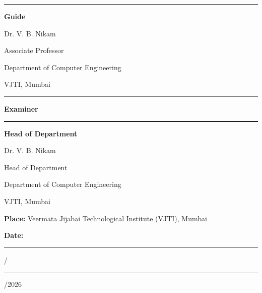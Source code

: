 \begin{minipage}[t]{0.30\textwidth}
	\centering
	
	\rule{5cm}{0.5pt}
	
	\vspace{0.25cm}
	
	\textbf{Guide}
	
	\vspace{0.2cm}
	
	Dr. V. B. Nikam
	
	Associate Professor
	
	Department of Computer Engineering
	
	VJTI, Mumbai
	
\end{minipage}
\hspace{1cm}
\begin{minipage}[t]{0.30\textwidth}
	\centering
	
	\rule{5cm}{0.5pt}
	
	\vspace{0.25cm}
	
	\textbf{Examiner}
	
	\vspace{0.2cm}
	
	\vspace{3.6\baselineskip} %
	
\end{minipage}
\hspace{1cm}
\begin{minipage}[t]{0.30\textwidth}
	\centering
	
	\rule{5cm}{0.5pt}
	
	\vspace{0.25cm}
	
	\textbf{Head of Department}
	
	\vspace{0.2cm}
	
	Dr. V. B. Nikam
	
	Head of Department
	
	Department of Computer Engineering
	
	VJTI, Mumbai
	
\end{minipage}
\vspace{1.5cm}


\noindent
\textbf{Place:} Veermata Jijabai Technological Institute (VJTI), Mumbai

\vspace{0.5cm}

\noindent
\textbf{Date:} \rule{2cm}{0.4pt}/\rule{2cm}{0.4pt}/2026

\clearpage

